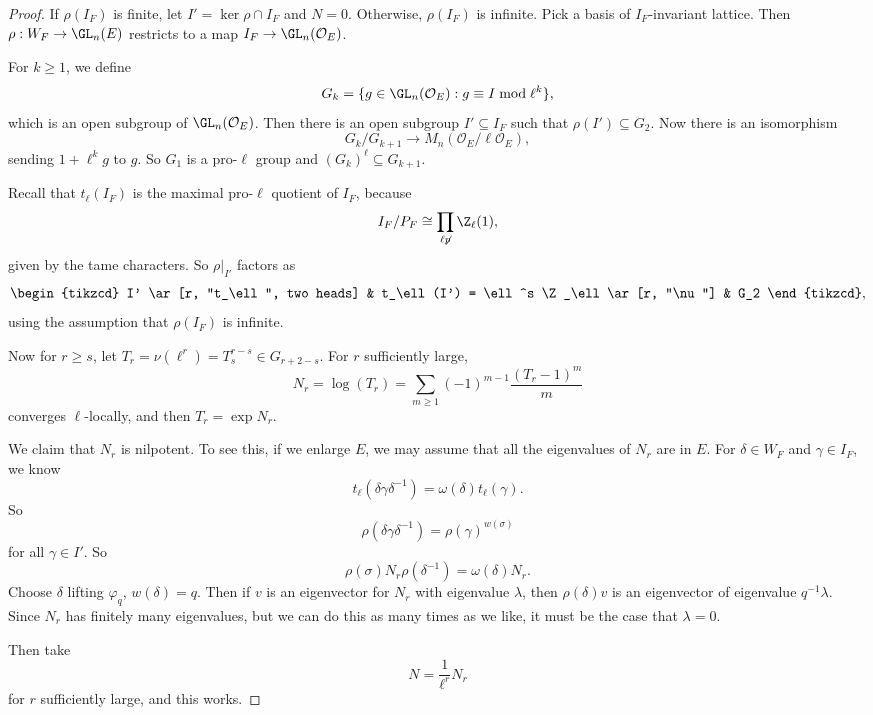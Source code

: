 \documentclass[a4paper]{article}
\begin{document}
\begin{proof}

  If $\rho(I_F)$ is finite, let $I' = \ker \rho \cap I_F$ and $N = 0$. Otherwise, $\rho(I_F)$ is infinite. Pick a basis of $I_F$-invariant lattice. Then $\rho: W_F \to \GL_n(E)$ restricts to a map $I_F \to \GL_n(\mathcal{O}_E)$.

  For $k \geq 1$, we define
  \[
    G_k = \{g \in \GL_n(\mathcal{O}_E) : g \equiv I \bmod \ell^k \},
  \]
  which is an open subgroup of $\GL_n(\mathcal{O}_E)$. Then there is an open subgroup $I' \subseteq I_F$ such that $\rho(I') \subseteq G_2$. Now there is an isomorphism
  \[
    G_k/G_{k + 1} \to M_n(\mathcal{O}_E/\ell \mathcal{O}_E),
  \]
  sending $1 + \ell^k g$ to $g$. So $G_1$ is a pro-$\ell$ group and $(G_k)^\ell \subseteq G_{k + 1}$.

  Recall that $t_\ell(I_F)$ is the maximal pro-$\ell$ quotient of $I_F$, because
  \[
    I_F/P_F \cong \prod_{\ell \not p} \Z_\ell(1),
  \]
  given by the tame characters. So $\rho|_{I'}$ factors as
  \[
    \begin{tikzcd}
      I' \ar[r, "t_\ell", two heads] & t_\ell(I') = \ell^s \Z_\ell \ar[r, "\nu"] & G_2
    \end{tikzcd},
  \]
  using the assumption that $\rho(I_F)$ is infinite.

  Now for $r \geq s$, let $T_r = \nu(\ell^r) = T_s^{r - s} \in G_{r + 2 - s}$. For $r$ sufficiently large,
  \[
    N_r = \log (T_r) = \sum_{m \geq 1} (-1)^{m - 1} \frac{(T_r - 1)^m}{m}
  \]
  converges $\ell$-locally, and then $T_r = \exp N_r$.

  We claim that $N_r$ is nilpotent. To see this, if we enlarge $E$, we may assume that all the eigenvalues of $N_r$ are in $E$. For $\delta \in W_F$ and $\gamma \in I_F$, we know
  \[
    t_\ell(\delta \gamma \delta^{-1}) = \omega(\delta) t_\ell(\gamma).
  \]
  So
  \[
    \rho(\delta \gamma \delta^{-1}) = \rho(\gamma)^{w(\sigma)}
  \]
  for all $\gamma \in I'$. So
  \[
    \rho(\sigma) N_r \rho(\delta^{-1}) = \omega(\delta) N_r.
  \]
  Choose $\delta$ lifting $\varphi_q$, $w(\delta) = q$. Then if $v$ is an eigenvector for $N_r$ with eigenvalue $\lambda$, then $\rho(\delta)v$ is an eigenvector of eigenvalue $q^{-1}\lambda$. Since $N_r$ has finitely many eigenvalues, but we can do this as many times as we like, it must be the case that $\lambda = 0$.

  Then take
  \[
    N = \frac{1}{\ell^r} N_r
  \]
  for $r$ sufficiently large, and this works.
\end{proof}
\end{document}
